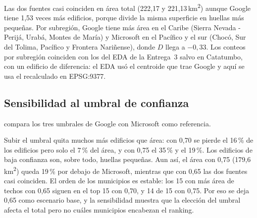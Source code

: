 

Las dos fuentes casi coinciden en área total (222,17 y 221,13\,km\textsuperscript{2})
aunque Google tiene 1,53 veces más edificios, porque divide la misma
superficie en huellas más pequeñas. Por subregión, Google tiene más área en el
Caribe (Sierra Nevada - Perijá, Urabá, Montes de María) y Microsoft en el
Pacífico y el sur (Chocó, Sur del Tolima, Pacífico y Frontera Nariñense), donde
$D$ llega a $-0{,}33$. Los conteos por subregión coinciden con los del EDA de
la Entrega~3 salvo en Catatumbo, con un edificio de diferencia: el EDA usó el
centroide que trae Google y aquí se usa el  recalculado en
EPSG:9377.

\subsection{Sensibilidad al umbral de confianza}

 compara los tres umbrales de Google con Microsoft
como referencia.



Subir el umbral quita muchos más edificios que área: con 0,70 se pierde el
16\,\% de los edificios pero solo el 7\,\% del área, y con 0,75 el 35\,\% y el
19\,\%. Los edificios de baja confianza son, sobre todo, huellas pequeñas.
Aun así, el área con 0,75 (179,6\,km\textsuperscript{2}) queda 19\,\% por
debajo de Microsoft, mientras que con 0,65 las dos fuentes casi coinciden.
El orden de los municipios es estable: los 15 con más área de techos con 0,65
siguen en el top 15 con 0,70, y 14 de 15 con 0,75. Por eso se deja 0,65 como
escenario base, y la sensibilidad muestra que la elección del umbral afecta
el total pero no cuáles municipios encabezan el ranking.

